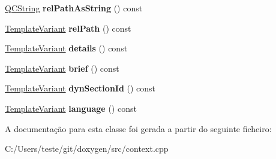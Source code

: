 \begin{DoxyCompactItemize}
\item 
\hypertarget{class_definition_context_a70249a4951b4dc99a4366b16e770fd81}{\hyperlink{class_q_c_string}{Q\-C\-String} {\bfseries rel\-Path\-As\-String} () const }\label{class_definition_context_a70249a4951b4dc99a4366b16e770fd81}

\item 
\hypertarget{class_definition_context_a68d3623b40481f2d31009257086699e4}{\hyperlink{class_template_variant}{Template\-Variant} {\bfseries rel\-Path} () const }\label{class_definition_context_a68d3623b40481f2d31009257086699e4}

\item 
\hypertarget{class_definition_context_a95547bd35e8be9312cb84a158e222338}{\hyperlink{class_template_variant}{Template\-Variant} {\bfseries details} () const }\label{class_definition_context_a95547bd35e8be9312cb84a158e222338}

\item 
\hypertarget{class_definition_context_a794a6d57cdb8529d969151189f489d73}{\hyperlink{class_template_variant}{Template\-Variant} {\bfseries brief} () const }\label{class_definition_context_a794a6d57cdb8529d969151189f489d73}

\item 
\hypertarget{class_definition_context_ab384299b426a83d6a80e23c55d976e34}{\hyperlink{class_template_variant}{Template\-Variant} {\bfseries dyn\-Section\-Id} () const }\label{class_definition_context_ab384299b426a83d6a80e23c55d976e34}

\item 
\hypertarget{class_definition_context_a3752491f44e48b1767da0de718900693}{\hyperlink{class_template_variant}{Template\-Variant} {\bfseries language} () const }\label{class_definition_context_a3752491f44e48b1767da0de718900693}

\end{DoxyCompactItemize}


A documentação para esta classe foi gerada a partir do seguinte ficheiro\-:\begin{DoxyCompactItemize}
\item 
C\-:/\-Users/teste/git/doxygen/src/context.\-cpp\end{DoxyCompactItemize}
